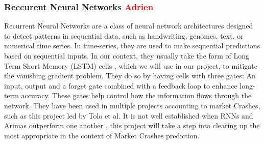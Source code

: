 \documentclass[12pt, letterpaper]{article}
\begin{document}
    \subsubsection*{Reccurent Neural Networks \textcolor{red}{Adrien}}
    Recurrent Neural Networks are a class of neural network architectures designed to detect patterns in sequential data, such as handwriting, genomes, text, or numerical time series. In time-series, they are used to make sequential predictions based on sequential inputs. \cite{Schmidt} In our context, they usually take the form of Long Term Short Memory (LSTM) cells \cite{Hansika}, which we will use in our project, to mitigate the vanishing gradient problem. They do so by having cells with three gates: An input, output and a forget gate combined with a feedback loop to enhance long-term accuracy. These gates help control how the information flows through the network. \cite{Hansika} They have been used in multiple projects accounting to market Crashes, such as this project led by Tolo et al. \cite{Tolo} It is not well established when RNNs and Arimas outperform one another \cite{Hansika}, this project will take a step into clearing up the most appropriate in the context of Market Crashes prediction.

\end{document}
